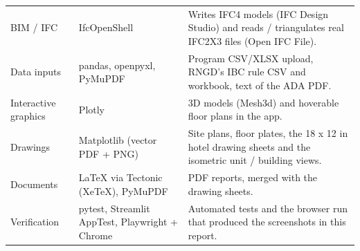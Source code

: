 \documentclass[10pt]{article}
\begin{document}
{\begin{longtable}{p{3.6cm}p{4.4cm}p{8cm}}
BIM / IFC & IfcOpenShell & Writes IFC4 models (IFC Design Studio) and reads / triangulates real IFC2X3 files (Open IFC File). \\
Data inputs & pandas, openpyxl, PyMuPDF & Program CSV/XLSX upload, RNGD's IBC rule CSV and workbook, text of the ADA PDF. \\
Interactive graphics & Plotly & 3D models (Mesh3d) and hoverable floor plans in the app. \\
Drawings & Matplotlib (vector PDF + PNG) & Site plans, floor plates, the 18 x 12 in hotel drawing sheets and the isometric unit / building views. \\
Documents & LaTeX via Tectonic (XeTeX), PyMuPDF & PDF reports, merged with the drawing sheets. \\
Verification & pytest, Streamlit AppTest, Playwright + Chrome & Automated tests and the browser run that produced the screenshots in this report. \\
\bottomrule\end{longtable}}
\end{document}
